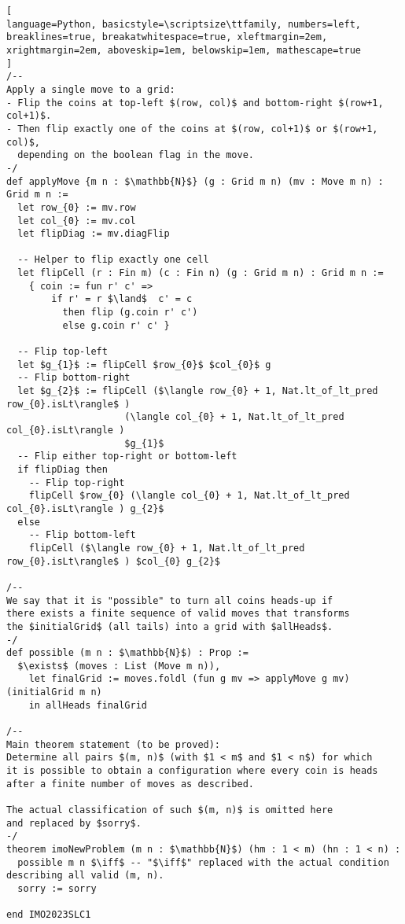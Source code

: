 \begin{tcolorbox}
\begin{lstlisting}[
language=Python, basicstyle=\scriptsize\ttfamily, numbers=left, breaklines=true, breakatwhitespace=true, xleftmargin=2em, xrightmargin=2em, aboveskip=1em, belowskip=1em, mathescape=true
]
/--
Apply a single move to a grid:
- Flip the coins at top-left $(row, col)$ and bottom-right $(row+1, col+1)$.
- Then flip exactly one of the coins at $(row, col+1)$ or $(row+1, col)$,
  depending on the boolean flag in the move.
-/
def applyMove {m n : $\mathbb{N}$} (g : Grid m n) (mv : Move m n) : Grid m n :=
  let row_{0} := mv.row
  let col_{0} := mv.col
  let flipDiag := mv.diagFlip

  -- Helper to flip exactly one cell
  let flipCell (r : Fin m) (c : Fin n) (g : Grid m n) : Grid m n :=
    { coin := fun r' c' =>
        if r' = r $\land$  c' = c
          then flip (g.coin r' c')
          else g.coin r' c' }

  -- Flip top-left
  let $g_{1}$ := flipCell $row_{0}$ $col_{0}$ g
  -- Flip bottom-right
  let $g_{2}$ := flipCell ($\langle row_{0} + 1, Nat.lt_of_lt_pred row_{0}.isLt\rangle$ )
                     (\langle col_{0} + 1, Nat.lt_of_lt_pred col_{0}.isLt\rangle )
                     $g_{1}$
  -- Flip either top-right or bottom-left
  if flipDiag then
    -- Flip top-right
    flipCell $row_{0} (\langle col_{0} + 1, Nat.lt_of_lt_pred col_{0}.isLt\rangle ) g_{2}$
  else
    -- Flip bottom-left
    flipCell ($\langle row_{0} + 1, Nat.lt_of_lt_pred row_{0}.isLt\rangle$ ) $col_{0} g_{2}$

/--
We say that it is "possible" to turn all coins heads-up if
there exists a finite sequence of valid moves that transforms
the $initialGrid$ (all tails) into a grid with $allHeads$.
-/
def possible (m n : $\mathbb{N}$) : Prop :=
  $\exists$ (moves : List (Move m n)),
    let finalGrid := moves.foldl (fun g mv => applyMove g mv) (initialGrid m n)
    in allHeads finalGrid

/--
Main theorem statement (to be proved):
Determine all pairs $(m, n)$ (with $1 < m$ and $1 < n$) for which
it is possible to obtain a configuration where every coin is heads
after a finite number of moves as described.

The actual classification of such $(m, n)$ is omitted here
and replaced by $sorry$. 
-/
theorem imoNewProblem (m n : $\mathbb{N}$) (hm : 1 < m) (hn : 1 < n) :
  possible m n $\iff$ -- "$\iff$" replaced with the actual condition describing all valid (m, n).
  sorry := sorry

end IMO2023SLC1
\end{lstlisting}
\end{tcolorbox}

